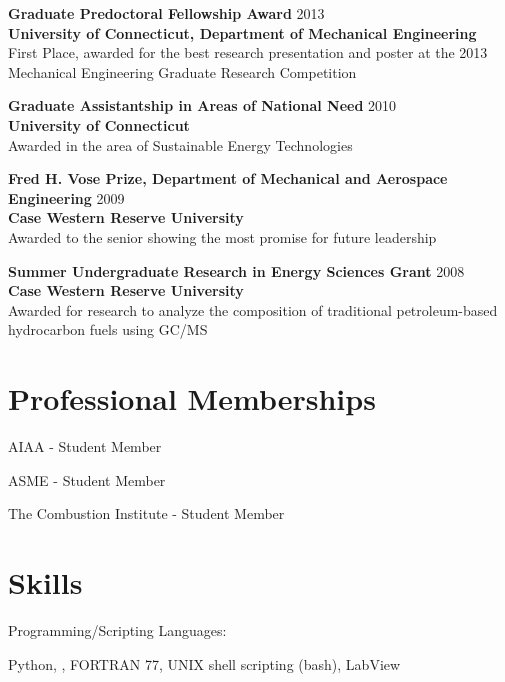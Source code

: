 \begin{lonelist}
   \item[] \textbf{Graduate Predoctoral Fellowship Award} \hfill 2013\\
           \textbf{University of Connecticut, Department of Mechanical
                   Engineering}\\
            First Place, awarded for the best research presentation and
            poster at the 2013 Mechanical Engineering Graduate Research 
            Competition
   \item[] \textbf{Graduate Assistantship in Areas of National 
                   Need} \hfill 2010\\
           \textbf{University of Connecticut}\\
            Awarded in the area of Sustainable Energy Technologies

   \item[] \textbf{Fred H. Vose Prize, Department of Mechanical and
                   Aerospace Engineering} \hfill 2009\\
           \textbf{Case Western Reserve University}\\
           Awarded to the senior showing the most promise for future 
           leadership

   \item[] \textbf{Summer Undergraduate Research in Energy Sciences
                   Grant} \hfill 2008\\
           \textbf{Case Western Reserve University}\\
           Awarded for research to analyze the composition of 
           traditional petroleum-based hydrocarbon fuels using GC/MS
\end{lonelist}

\section{Professional Memberships}
AIAA - Student Member

ASME - Student Member

The Combustion Institute - Student Member


\section{Skills}
Programming/Scripting Languages:
%
\begin{innerlist}
    \item Python, \Matlab, FORTRAN 77, UNIX shell scripting (bash), LabView
\end{innerlist}

